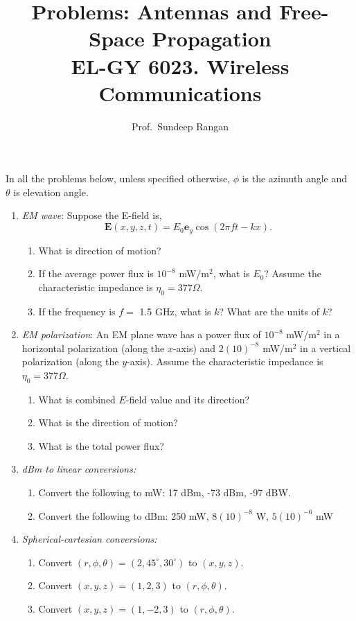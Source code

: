 \documentclass[11pt]{article}
\newcommand{\ebf}{\mathbf{e}}
\newcommand{\Ebf}{\mathbf{E}}
\begin{document}
\title{Problems: Antennas and Free-Space Propagation\\
EL-GY 6023. Wireless Communications}
\author{Prof.\ Sundeep Rangan}
\date{}

\maketitle

In all the problems below, unless specified otherwise, $\phi$ is the
azimuth angle and $\theta$ is elevation angle.

\begin{enumerate}
\item \emph{EM wave}:  Suppose the E-field is,
\[
    \Ebf(x,y,z,t) = E_0 \ebf_y \cos(2\pi f t - kx).
\]
\begin{enumerate}[label=(\alph*)]
  \item What is direction of motion?
  \item If the average power flux is $10^{-8}$ mW/m$^2$, what is $E_0$?
   Assume the characteristic impedance is $\eta_0 = 377 \Omega$.
  \item If the frequency is $f=$ 1.5 GHz, what is $k$?
  What are the units of $k$?
\end{enumerate}

\item \emph{EM polarization}:  An EM plane wave has
a power flux of $10^{-8}$ mW/m$^2$ in a horizontal polarization (along the $x$-axis)
and $2(10)^{-8}$ mW/m$^2$ in a vertical polarization (along the $y$-axis).
Assume the characteristic impedance is $\eta_0 = 377 \Omega$.
\begin{enumerate}[label=(\alph*)]
  \item What is combined $E$-field value and its direction?
  \item What is the direction of motion?
  \item What is the total power flux?
\end{enumerate}


\item \emph{dBm to linear conversions:}
\begin{enumerate}[label=(\alph*)]
\item Convert the following to mW:   17 dBm, -73 dBm, -97 dBW.
\item Convert the following to dBm: 250 mW, $8(10)^{-8}$ W, $5(10)^{-6}$ mW
\end{enumerate}


\item \emph{Spherical-cartesian conversions:}
\begin{enumerate}[label=(\alph*)]
  \item Convert $(r,\phi,\theta)=(2,45^\circ,30^\circ)$ to $(x,y,z)$.
  \item Convert $(x,y,z) = (1,2,3)$ to $(r,\phi,\theta)$.
  \item Convert $(x,y,z) = (1,-2,3)$ to $(r,\phi,\theta)$.
\end{enumerate}


\end{enumerate}
\end{document}
